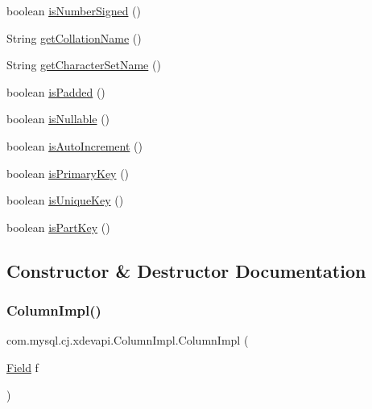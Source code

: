 \begin{DoxyCompactItemize}
boolean \mbox{\hyperlink{classcom_1_1mysql_1_1cj_1_1xdevapi_1_1_column_impl_a58aa38ee6752103b23876d8327e5be76}{is\+Number\+Signed}} ()
\item 
String \mbox{\hyperlink{classcom_1_1mysql_1_1cj_1_1xdevapi_1_1_column_impl_a1477001fa773c05ff8662f6fe20e1722}{get\+Collation\+Name}} ()
\item 
String \mbox{\hyperlink{classcom_1_1mysql_1_1cj_1_1xdevapi_1_1_column_impl_afccaa3500333c1b3fd3c0e280a472cb9}{get\+Character\+Set\+Name}} ()
\item 
boolean \mbox{\hyperlink{classcom_1_1mysql_1_1cj_1_1xdevapi_1_1_column_impl_a6320a3b7933635716d8d660229f27de2}{is\+Padded}} ()
\item 
boolean \mbox{\hyperlink{classcom_1_1mysql_1_1cj_1_1xdevapi_1_1_column_impl_ab72411532be4aa28a9da5ba72e8c009f}{is\+Nullable}} ()
\item 
boolean \mbox{\hyperlink{classcom_1_1mysql_1_1cj_1_1xdevapi_1_1_column_impl_a40b4f8bd96fbfe0035f033263cfa6aa6}{is\+Auto\+Increment}} ()
\item 
boolean \mbox{\hyperlink{classcom_1_1mysql_1_1cj_1_1xdevapi_1_1_column_impl_a56cfe1448b9b4939807627e187a1b9c7}{is\+Primary\+Key}} ()
\item 
boolean \mbox{\hyperlink{classcom_1_1mysql_1_1cj_1_1xdevapi_1_1_column_impl_a236fda9cc758db2ffba1a03171c1a84d}{is\+Unique\+Key}} ()
\item 
boolean \mbox{\hyperlink{classcom_1_1mysql_1_1cj_1_1xdevapi_1_1_column_impl_ab6bb9c64f531334a705336fd107fa3b2}{is\+Part\+Key}} ()
\end{DoxyCompactItemize}


\subsection{Constructor \& Destructor Documentation}
\mbox{\label{classcom_1_1mysql_1_1cj_1_1xdevapi_1_1_column_impl_ab6b38221345090a79280015607816b56}} 
\subsubsection{\texorpdfstring{Column\+Impl()}{ColumnImpl()}}
{\footnotesize\ttfamily com.\+mysql.\+cj.\+xdevapi.\+Column\+Impl.\+Column\+Impl (\begin{DoxyParamCaption}\item[{\mbox{\hyperlink{classcom_1_1mysql_1_1cj_1_1result_1_1_field}{Field}}}]{f }\end{DoxyParamCaption})}



